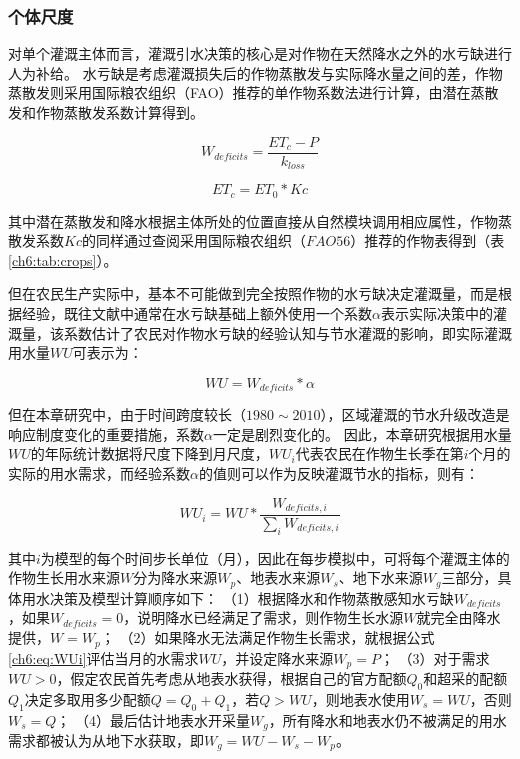 \subsubsection*{个体尺度}

对单个灌溉主体而言，灌溉引水决策的核心是对作物在天然降水之外的水亏缺进行人为补给。
水亏缺是考虑灌溉损失后的作物蒸散发与实际降水量之间的差，作物蒸散发则采用国际粮农组织（FAO）推荐的单作物系数法进行计算，由潜在蒸散发和作物蒸散发系数计算得到。

\begin{equation}
    \label{ch6:eq:deficits}
    W_{deficits} = \frac{ET_c - P}{k_{loss}}
\end{equation}

\begin{equation}
    \label{ch6:eq:etc}
    ET_c = ET_{0} * Kc
\end{equation}

其中潜在蒸散发和降水根据主体所处的位置直接从自然模块调用相应属性，作物蒸散发系数$Kc$的同样通过查阅采用国际粮农组织（$FAO56$）推荐的作物表得到（表\ref{ch6:tab:crops}）。



但在农民生产实际中，基本不可能做到完全按照作物的水亏缺决定灌溉量，而是根据经验，既往文献中通常在水亏缺基础上额外使用一个系数$\alpha$表示实际决策中的灌溉量，该系数估计了农民对作物水亏缺的经验认知与节水灌溉的影响，即实际灌溉用水量$WU$可表示为：

\begin{equation}
    \label{ch6:eq:WU}
    WU = W_{deficits} * \alpha
\end{equation}

但在本章研究中，由于时间跨度较长（$1980 \sim 2010$），区域灌溉的节水升级改造是响应制度变化的重要措施，系数$\alpha$一定是剧烈变化的。
因此，本章研究根据用水量$WU$的年际统计数据将尺度下降到月尺度，$WU_i$代表农民在作物生长季在第$i$个月的实际的用水需求，而经验系数$\alpha$的值则可以作为反映灌溉节水的指标，则有：

\begin{equation}
    \label{ch6:eq:WUi}
    WU_i = WU * \frac{W_{deficits, i}}{\sum_{i} W_{deficits, i}}
\end{equation}

其中$i$为模型的每个时间步长单位（月），因此在每步模拟中，可将每个灌溉主体的作物生长用水来源$W$分为降水来源$W_p$、地表水来源$W_s$、地下水来源$W_g$三部分，具体用水决策及模型计算顺序如下：
（1）根据降水和作物蒸散感知水亏缺$W_{deficits}$，如果$W_{deficits}=0$，说明降水已经满足了需求，则作物生长水源$W$就完全由降水提供，$W=W_{p}$；
（2）如果降水无法满足作物生长需求，就根据公式\ref{ch6:eq:WUi}评估当月的水需求$WU$，并设定降水来源$W_{p} = P$；
（3）对于需求$WU > 0$，假定农民首先考虑从地表水获得，根据自己的官方配额$Q_{0}$和超采的配额$Q_{1}$决定多取用多少配额$Q = Q_{0} + Q_{1}$，若$Q > WU$，则地表水使用$W_s = WU$，否则$W_s = Q$；
（4）最后估计地表水开采量$W_g$，所有降水和地表水仍不被满足的用水需求都被认为从地下水获取，即$W_g = WU - W_s - W_p$。


